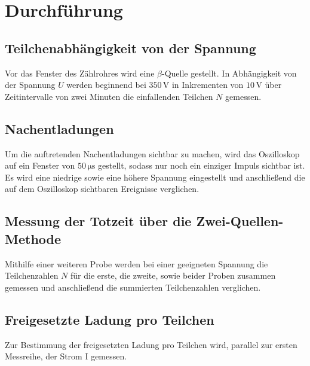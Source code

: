 \section{Durchführung}
\label{sec:Durchführung}

\subsection*{Teilchenabhängigkeit von der Spannung}

Vor das Fenster des Zählrohres wird eine $\beta$-Quelle gestellt.
In Abhängigkeit von der Spannung $U$ werden beginnend bei $350 \,\unit{\volt}$ in Inkrementen von $10 \,\unit{\volt}$
über Zeitintervalle von zwei Minuten die einfallenden Teilchen $N$ gemessen.

\subsection*{Nachentladungen}

Um die auftretenden Nachentladungen sichtbar zu machen, wird das Oszilloskop auf ein Fenster von $50 \,\unit{\micro\second}$
gestellt, sodass nur noch ein einziger Impuls sichtbar ist.
Es wird eine niedrige sowie eine höhere Spannung eingestellt und anschließend die auf dem Oszilloskop sichtbaren Ereignisse verglichen.

\subsection*{Messung der Totzeit über die Zwei-Quellen-Methode}

Mithilfe einer weiteren Probe werden bei einer geeigneten Spannung die Teilchenzahlen $N$ für die erste, die zweite, sowie
beider Proben zusammen gemessen und anschließend die summierten Teilchenzahlen verglichen.

\subsection*{Freigesetzte Ladung pro Teilchen}

Zur Bestimmung der freigesetzten Ladung pro Teilchen wird, parallel zur ersten Messreihe, der Strom I gemessen.

